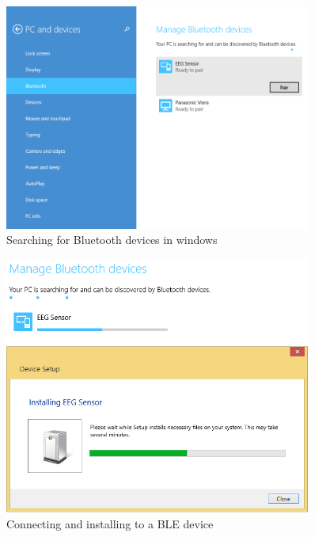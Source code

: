 \documentclass[]{article}
\begin{document}
\begin{figure}[htb]
	\begin{center}
		\includegraphics[width = 0.9\textwidth]{searching}
	\end{center}
	\caption{Searching for Bluetooth devices in windows}
	\label{fig:searching}
\end{figure}

\begin{figure}[htb]
	\begin{center}
		\includegraphics[width = 0.9\textwidth]{connecting}
	\end{center}
	\caption{Connecting and installing to a \ac{BLE} device}
	\label{fig:connecting}
\end{figure}
\end{document}
